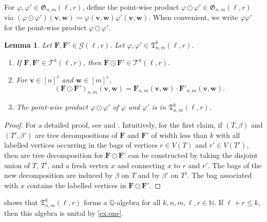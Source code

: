 \documentclass[11pt, DIV=15]{scrarticle}
\theoremstyle{definition}
\theoremstyle{plain}
\newtheorem{lemma}[definition]{Lemma}
\theoremstyle{remark}
\renewcommand{\phi}{\varphi}
\begin{document}
	For $\phi, \phi' \in \mathfrak{G}_{n,m}(\ell, r)$, define  the point-wise product $\phi \odot \phi' \in \mathfrak{G}_{n,m}(\ell, r)$ via $(\phi \odot \phi')(\boldsymbol{v}, \boldsymbol{w}) \coloneqq \phi(\boldsymbol{v}, \boldsymbol{w}) \phi'(\boldsymbol{v}, \boldsymbol{w})$.
	When convenient, we write $\phi \phi'$ for the point-wise product $\phi \odot \phi'$.

	\begin{lemma}\label{lem:gluing}
		Let $\boldsymbol{F}, \boldsymbol{F}' \in \mathcal{G}(\ell, r)$.
		Let $\phi, \phi' \in \mathfrak{T}^k_{n,m}(\ell, r)$.
		\begin{enumerate}
			\item If $\boldsymbol{F}, \boldsymbol{F}' \in \mathcal{T}^k(\ell, r)$,
			then $\boldsymbol{F} \odot \boldsymbol{F}' \in \mathcal{T}^k(\ell, r)$.
			\item For $\boldsymbol{v} \in [n]^\ell$ and $\boldsymbol{w} \in [m]^r$,  			\[
				(\boldsymbol{F} \odot \boldsymbol{F}')_{n,m}(\boldsymbol{v}, \boldsymbol{w})  = \boldsymbol{F}_{n,m}(\boldsymbol{v}, \boldsymbol{w}) \cdot \boldsymbol{F}'_{n,m}(\boldsymbol{v}, \boldsymbol{w}).
			\]
			\item The point-wise product $\phi \odot \phi'$ of $\phi$ and $\phi'$ is in $\mathfrak{T}^k_{n,m}(\ell, r)$.
		\end{enumerate}
	\end{lemma}
	\begin{proof}
		For a detailed proof, see \cite[Lemma 6.13]{grohe_homomorphism_2025} and \cite[Lemma 3.2.13]{seppelt_homomorphism_2024}.
		Intuitively, for the first claim, if $(T, \beta)$ and $(T', \beta')$ are tree decompositions of $\boldsymbol{F}$ and $\boldsymbol{F}'$ of width less than $k$ with all labelled vertices occurring in the bags of vertices $r \in V(T)$ and $r' \in V(T')$, 
		then are tree decomposition for $\boldsymbol{F} \odot \boldsymbol{F}'$ can be constructed by taking the disjoint union of $T$, $T'$, and a fresh vertex $x$ and connecting $x$ to $r$ and $r'$.
		The bags of the new decomposition are induced by $\beta$ on $T$ and by $\beta'$ on $T'$.
		The bag associated with $x$ contains the labelled vertices in $\boldsymbol{F} \odot \boldsymbol{F}'$.
	\end{proof}

	 shows that $\mathfrak{T}^k_{n,m}(\ell,r)$ forms a $\mathbb{Q}$-algebra for all $k,n,m, \ell, r \in \mathbb{N}$.
	If $\ell +r \leq k$, then this algebra is unital by \cref{ex:one}.
		
	 
\end{document}
